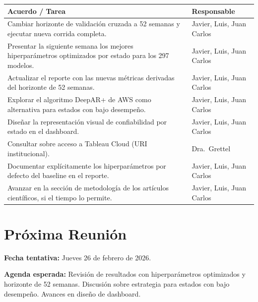 \documentclass[11pt,letterpaper]{article}
\begin{document}
\renewcommand{\arraystretch}{1.4}
\begin{tabular}{@{}p{}p{}@{}}
    \toprule
    \textbf{Acuerdo / Tarea} & \textbf{Responsable} \\
    \midrule
    Cambiar horizonte de validación cruzada a 52 semanas y ejecutar nueva corrida completa. & Javier, Luis, Juan Carlos \\
    Presentar la siguiente semana los mejores hiperparámetros optimizados por estado para los 297 modelos. & Javier, Luis, Juan Carlos \\
    Actualizar el reporte con las nuevas métricas derivadas del horizonte de 52 semanas. & Javier, Luis, Juan Carlos \\
    Explorar el algoritmo DeepAR+ de AWS como alternativa para estados con bajo desempeño. & Javier, Luis, Juan Carlos \\
    Diseñar la representación visual de confiabilidad por estado en el dashboard. & Javier, Luis, Juan Carlos \\
    Consultar sobre acceso a Tableau Cloud (URI institucional). & Dra.\ Grettel \\
    Documentar explícitamente los hiperparámetros por defecto del baseline en el reporte. & Javier, Luis, Juan Carlos \\
    Avanzar en la sección de metodología de los artículos científicos, si el tiempo lo permite. & Javier, Luis, Juan Carlos \\
    \bottomrule
\end{tabular}

\vspace{1.5em}

\section{Próxima Reunión}

\textbf{Fecha tentativa:} Jueves 26 de febrero de 2026.

\textbf{Agenda esperada:} Revisión de resultados con hiperparámetros optimizados y horizonte de 52 semanas. Discusión sobre estrategia para estados con bajo desempeño. Avances en diseño de dashboard.
\end{document}
